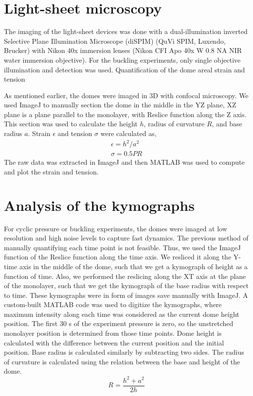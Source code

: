 \section{Light-sheet microscopy}
The imaging of the light-sheet devices was done with a dual-illumination inverted Selective Plane Illumination Microscope (diSPIM) (QuVi SPIM, Luxendo, Brucker) with Nikon 40x immersion lenses (Nikon CFI Apo 40x W 0.8 NA NIR water immersion objective). For the buckling experiments, only single objective illumination and detection was used.
Quantification of the dome areal strain and tension

As mentioned earlier, the domes were imaged in 3D with confocal microscopy. We used ImageJ to manually section the dome in the middle in the YZ plane, XZ plane is a plane parallel to the monolayer, with Reslice function along the Z axis. This section was used to calculate the height $h$, radius of curvature $R$, and base radius $a$. Strain $\epsilon$ and tension $\sigma$ were calculated as, 
$$ 
\begin{array}{c}
\epsilon = h^2/a^2 \\
\sigma = 0.5PR 
\end{array}
$$
The raw data was extracted in ImageJ and then MATLAB was used to compute and plot the strain and tension.

\section{Analysis of the kymographs}

For cyclic pressure or buckling experiments, the domes were imaged at low resolution and high noise levels to capture fast dynamics. The previous method of manually quantifying each time point is not feasible. Thus, we used the ImageJ function of the Reslice function along the time axis. We resliced it along the Y-time axis in the middle of the dome, such that we get a kymograph of height as a function of time. Also, we performed the reslicing along the XT axis at the plane of the monolayer, such that we get the kymograph of the base radius with respect to time. These kymographs were in form of images save manually with ImageJ. A custom-built MATLAB code was used to digitize the kymographs, where maximum intensity along each time was considered as the current dome height position. The first 30 s of the experiment pressure is zero, so the unstretched monolayer position is determined from those time points. Dome height is calculated with the difference between the current position and the initial position. Base radius is calculated similarly by subtracting two sides. The radius of curvature is calculated using the relation between the base and height of the dome. $$R = \frac{h^2+a^2}{2h}$$

